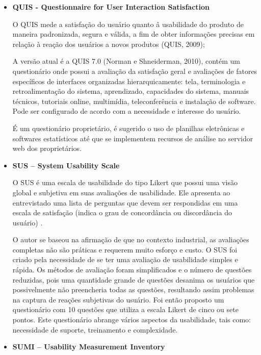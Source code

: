 \begin{itemize}

\item \textbf{QUIS - Questionnaire for User Interaction Satisfaction}

	O QUIS mede a satisfação do usuário quanto â usabilidade do produto de maneira padronizada, segura e válida, a fim de obter informações precisas em relação à reação dos usuários a novos produtos (QUIS, 2009);

	A versão atual é a QUIS 7.0 (Norman e Shneiderman, 2010), contém um questionário onde possui a avaliação da satisfação geral e avaliações de fatores específicos de interfaces organizadas hierarquicamente: tela, terminologia e retroalimentação do sistema, aprendizado, capacidades do sistema, manuais técnicos, tutoriais online, multimídia, teleconferência e instalação de software. Pode ser configurado de acordo com a necessidade e interesse do usuário. 

	É um questionário proprietário, é sugerido o uso de planilhas eletrônicas e softwares estatísticos até que se implementem recursos de análise no servidor web dos proprietários.

\item \textbf{SUS – System Usability Scale}

	O SUS é uma escala de usabilidade do tipo Likert que possui uma visão global e subjetiva em suas avaliações de usabilidade. Ele apresenta ao entrevistado uma lista de perguntas que devem ser respondidas em uma escala de satisfação (indica o grau de concordância ou discordância do usuário) \cite{brooke1996sus}.

	O autor se baseou na afirmação de que no contexto industrial, as avaliações completas não são práticas e requerem muito esforço e custo. O SUS foi criado pela necessidade de se ter uma avaliação de usabilidade simples e rápida. Os métodos de avaliação foram simplificados e o número de questões reduzidas, pois uma quantidade grande de questões desanima os usuários que possivelmente não preencheria todas as questões, resultando assim problemas na captura de reações subjetivas do usuário. Foi então proposto um questionário com 10 questões que utiliza a escala Likert de cinco ou sete pontos. Este questionário abrange vários aspectos da usabilidade, tais como: necessidade de suporte, treinamento e complexidade. %

\item \textbf{SUMI – Usability Measurement Inventory}


\end{itemize}
